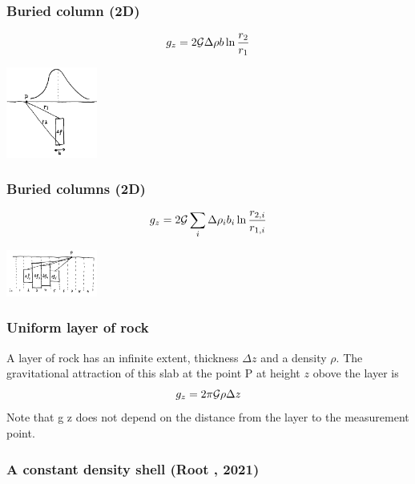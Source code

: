 \subsubsection{Buried column (2D)}

\[
g_z=2 {\cal G} \Delta \rho b \ln \frac{r_2}{r_1}
\]

\begin{center}
\includegraphics[width=3cm]{images/gravity/column}
\end{center}

\subsubsection{Buried columns (2D)}

\[
g_z=2 {\cal G} \sum_i  \Delta \rho_i  b_i  \ln \frac{r_{2,i}}{r_{1,i}}
\]

\begin{center}
\includegraphics[width=3cm]{images/gravity/columns}
\end{center}





\subsubsection{Uniform layer of rock}

A layer of rock has an infinite extent, thickness $\Delta z$ 
and a density $\rho$. The gravitational
attraction of this slab at the point P at height $z$ obove the layer is 
\[
g_z=2 \pi {\cal G} \rho \Delta z
\]
Note that g z does not depend on the distance from the layer to the measurement point.



\newpage
\subsubsection{A constant density shell (Root \etal, 2021)}

